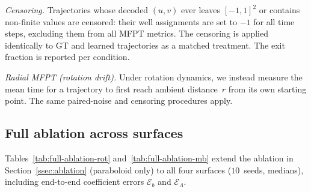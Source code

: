 \documentclass[11pt]{article}
\newcommand{\cE}{\mathcal{E}}
\begin{document}
\emph{Censoring.}
Trajectories whose decoded $(u,v)$ ever leaves
$[-1,1]^2$ or contains non-finite values are censored:
their well assignments are set to $-1$ for all time steps,
excluding them from all MFPT metrics.
The censoring is applied identically to GT and learned
trajectories as a matched treatment.
The exit fraction is reported per condition.

\emph{Radial MFPT (rotation drift).}
Under rotation dynamics, we instead measure the mean time for
a trajectory to first reach ambient distance~$r$ from its own
starting point.
The same paired-noise and censoring procedures apply.

\subsection{Full ablation across surfaces}\label{app:full-ablation}

Tables~\ref{tab:full-ablation-rot} and~\ref{tab:full-ablation-mb}
extend the ablation in Section~\ref{ssec:ablation} (paraboloid only)
to all four surfaces ($10$~seeds, medians),
including end-to-end coefficient errors $\cE_b$ and
$\cE_\Lambda$.
\end{document}
